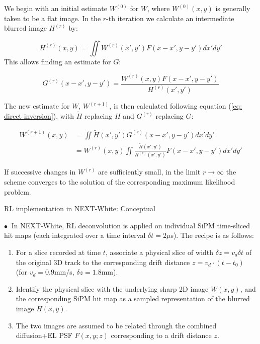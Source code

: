 \documentclass [aspectratio=169]{beamer}
\begin{document}
\begin{frame}
We begin with an initial estimate $W^{(0)}$ for $W$, where $W^{(0)}(x,y)$ is generally taken to be a flat image. In the $r$-th iteration we calculate an intermediate blurred image $H^{(r)}$ by:

\begin{equation}
H^{(r)}(x,y)=\iint W^{(r)}(x',y') F(x-x',y-y') dx' dy' \label{eq: H(r)}
\end{equation}   
This allows finding an estimate for $G$:

\begin{equation}
G^{(r)}(x-x',y-y')=\frac{W^{(r)}(x,y) F(x-x',y-y')}{H^{(r)}(x',y')} \label{eq: G(r)}  
\end{equation}

The new estimate for $W$, $W^{(r+1)}$, is then calculated following equation (\ref{eq: direct inversion}), with $\tilde{H}$ replacing $H$ and $G^{(r)}$ replacing $G$:

\begin{equation}
\begin{split}
W^{(r+1)}(x,y) &= \iint \tilde{H}(x',y') G^{(r)}(x-x',y-y') dx' dy' \\
&= W^{(r)}(x,y) \iint \frac{\tilde{H}(x',y')}{H^{(r)}(x',y')} F(x-x',y-y') dx' dy' \label{eq: W(r)}
\end{split}
\end{equation}

If successive changes in $W^{(r)}$ are sufficiently small, in the limit $r \rightarrow \infty$ the scheme converges to the solution of the corresponding maximum likelihood problem.

\end{frame}
\begin{frame}{RL implementation in NEXT-White: Conceptual}

$\bullet~$ In NEXT-White, RL deconvolution is applied on individual SiPM time-sliced hit maps (each integrated over a time interval $\delta t=2$\;$\mu$s). The recipe is as follows:
\begin{enumerate}
\item {\color{uwopurple} For a slice recorded at time $t$, associate a physical slice of width $\delta z=v_d\delta t$ of the original 3D track to the corresponding drift distance $z=v_d\cdot(t-t_0)$ (for $v_d=0.9$\;mm/s, $\delta z=1.8$\;mm). }
\item  {\color{uwopurple}  Identify the physical slice with the underlying sharp 2D image $W(x,y)$, and the corresponding SiPM hit map as a sampled representation of the blurred image $\tilde{H}(x,y)$.}
\item  {\color{uwopurple} The two images are assumed to be related through the combined diffusion+EL PSF $F(x,y;z)$ corresponding to a drift distance $z$. }
\end{enumerate}

\end{frame}
\end{document}
